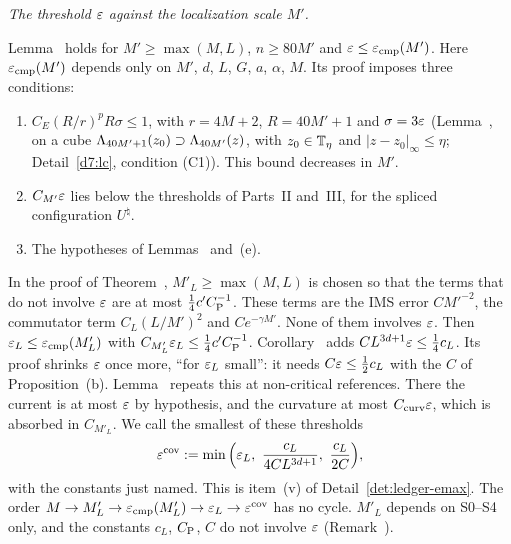 \begin{detail}\label{det:ledger-eps-M}
\emph{The threshold $\varepsilon$ against the localization scale $M'$.}

\begin{step}
Lemma~ holds for $M'\ge\max(M,L)$, $n\ge80M'$ and $\varepsilon\le\varepsilon_{\rm cmp}(M')$. Here $\varepsilon_{\rm cmp}(M')$ depends only on $M'$, $d$, $L$, $G$, $a$, $\alpha$, $M$. Its proof imposes three conditions:
\begin{enumerate}[label=(\arabic*)]
\item $C_E(R/r)^pR\sigma\le1$, with $r=4M+2$, $R=40M'+1$ and $\sigma=3\varepsilon$ (Lemma~, on a cube $\Lambda_{40M'+1}(z_0)\supset\Lambda_{40M'}(z)$, with $z_0\in\mathbb T_\eta$ and $|z-z_0|_\infty\le\eta$; Detail~\ref{d7:lc}, condition (C1)). This bound decreases in $M'$.
\item $C_{M'}\varepsilon$ lies below the thresholds of Parts~II and~III, for the spliced configuration $U^\natural$.
\item The hypotheses of Lemmas~ and~(e).
\end{enumerate}
In the proof of Theorem~, $M'_L\ge\max(M,L)$ is chosen so that the terms that do not involve $\varepsilon$ are at most $\frac14c'C_{\rm P}^{-1}$. These terms are the IMS error $CM'^{-2}$, the commutator term $C_L(L/M')^2$ and $Ce^{-\gamma M'}$. None of them involves $\varepsilon$. Then $\varepsilon_L\le\varepsilon_{\rm cmp}(M'_L)$ with $C_{M'_L}\varepsilon_L\le\frac14c'C_{\rm P}^{-1}$. Corollary~ adds $CL^{3d+1}\varepsilon\le\frac14c_L$. Its proof shrinks $\varepsilon$ once more, ``for $\varepsilon_L$ small'': it needs $C\varepsilon\le\frac12c_L$ with the $C$ of Proposition~(b). Lemma~ repeats this at non-critical references. There the current is at most $\varepsilon$ by hypothesis, and the curvature at most $C_{\rm curv}\varepsilon$, which is absorbed in $C_{M'_L}$. We call the smallest of these thresholds
\[
\eps^{\rm cov}:=\min\Big(\eps_L,\ \frac{c_L}{4CL^{3d+1}},\ \frac{c_L}{2C}\Big),
\]
with the constants just named. This is item~(v) of Detail~\ref{det:ledger-emax}. The order $M\to M'_L\to\varepsilon_{\rm cmp}(M'_L)\to\varepsilon_L\to\varepsilon^{\rm cov}$ has no cycle. $M'_L$ depends on S0--S4 only, and the constants $c_L$, $C_{\rm P}$, $C$ do not involve $\varepsilon$ (Remark~).
\end{step}


\end{detail}
